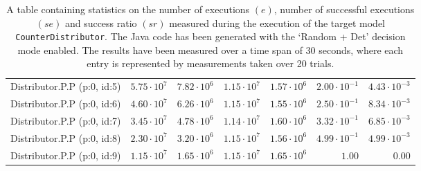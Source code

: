 \begin{table}[htbp]
{\begin{tabular}{lrrrrrr}
\hspace{3mm}Distributor.P.P (p:0, id:5) & $5.75 \cdot 10^{7}$ & $7.82 \cdot 10^{6}$ & $1.15 \cdot 10^{7}$ & $1.57 \cdot 10^{6}$ & $2.00 \cdot 10^{-1}$ & $4.43 \cdot 10^{-3}$ \\
\hspace{3mm}Distributor.P.P (p:0, id:6) & $4.60 \cdot 10^{7}$ & $6.26 \cdot 10^{6}$ & $1.15 \cdot 10^{7}$ & $1.55 \cdot 10^{6}$ & $2.50 \cdot 10^{-1}$ & $8.34 \cdot 10^{-3}$ \\
\hspace{3mm}Distributor.P.P (p:0, id:7) & $3.45 \cdot 10^{7}$ & $4.78 \cdot 10^{6}$ & $1.14 \cdot 10^{7}$ & $1.60 \cdot 10^{6}$ & $3.32 \cdot 10^{-1}$ & $6.85 \cdot 10^{-3}$ \\
\hspace{3mm}Distributor.P.P (p:0, id:8) & $2.30 \cdot 10^{7}$ & $3.20 \cdot 10^{6}$ & $1.15 \cdot 10^{7}$ & $1.56 \cdot 10^{6}$ & $4.99 \cdot 10^{-1}$ & $4.99 \cdot 10^{-3}$ \\
\hspace{3mm}Distributor.P.P (p:0, id:9) & $1.15 \cdot 10^{7}$ & $1.65 \cdot 10^{6}$ & $1.15 \cdot 10^{7}$ & $1.65 \cdot 10^{6}$ &               $1.00$ &               $0.00$ \\
\bottomrule
\end{tabular}
}
\caption{A table containing statistics on the number of executions $(e)$, number of successful executions $(se)$ and success ratio $(sr)$ measured during the execution of the target model \texttt{CounterDistributor}. The Java code has been generated with the `Random + Det' decision mode enabled. The results have been measured over a time span of 30 seconds, where each entry is represented by measurements taken over 20 trials.}
\label{table:frequency_results_counterdistributor_random_det}
\end{table}